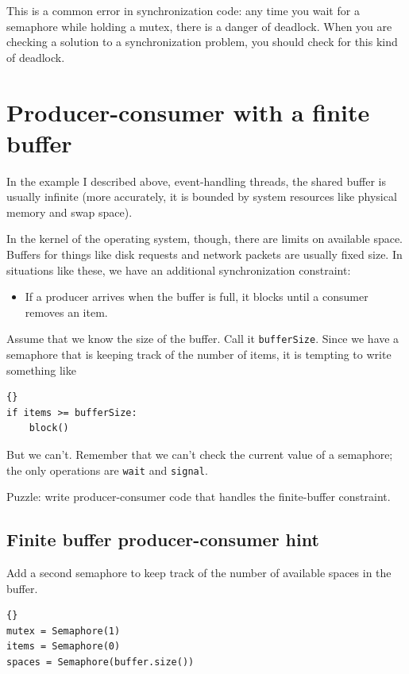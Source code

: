 \documentclass{book}
\newcommand{\clearemptydoublepage}{\newpage\cleardoublepage}
\begin{document}
This is a common error in synchronization code: any time
you wait for a semaphore while holding a mutex, there is
a danger of deadlock.  When you are checking a solution to
a synchronization problem, you should check for this kind
of deadlock.


\section{Producer-consumer with a finite buffer}

In the example I described above, event-handling threads,
the shared buffer is usually infinite (more accurately, it is
bounded by system resources like physical memory and swap
space).

In the kernel of the operating system, though, there are
limits on available space.  Buffers for things like disk
requests and network packets are usually fixed size.  In
situations like these, we have an additional synchronization
constraint:

\begin{itemize}

\item If a producer arrives when the buffer is full, it
blocks until a consumer removes an item.

\end{itemize}

Assume that we know the size of the buffer.  Call it
{\tt bufferSize}.  Since we have a semaphore that is keeping
track of the number of items, it is tempting to write something
like 

\begin{lstlisting}[title={Broken finite buffer solution}]{}
if items >= bufferSize:
    block()
\end{lstlisting}

But we can't.  Remember that we can't check the current
value of a semaphore; the only operations are {\tt wait}
and {\tt signal}.

Puzzle: write producer-consumer code that handles the finite-buffer
constraint.

\clearemptydoublepage
\subsection{Finite buffer producer-consumer hint}

Add a second semaphore to keep track of the number of
available spaces in the buffer.

\begin{lstlisting}[title={Finite-buffer producer-consumer initialization}]{}
mutex = Semaphore(1)
items = Semaphore(0)
spaces = Semaphore(buffer.size())
\end{lstlisting}
\end{document}
